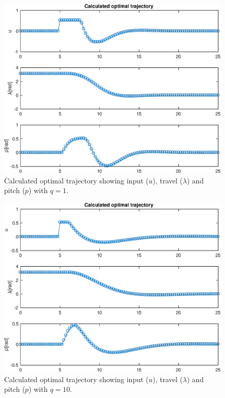 \begin{figure}[H]
    \centering
    \captionsetup{justification=centering}
    \includegraphics[scale=0.5]{data_10.2/All_states_q_1.eps}
    \caption{Calculated optimal trajectory showing input ($u$), travel ($\lambda$) and pitch ($p$) with $q = 1$.}
    \label{fig:10_2_q_1}
\end{figure}

\begin{figure}[H]
    \centering
    \captionsetup{justification=centering}
    \includegraphics[scale=0.5]{data_10.2/All_states_q_10.eps}
    \caption{Calculated optimal trajectory showing input ($u$), travel ($\lambda$) and pitch ($p$) with $q = 10$.}
    \label{fig:10_2_q_10}
\end{figure}

